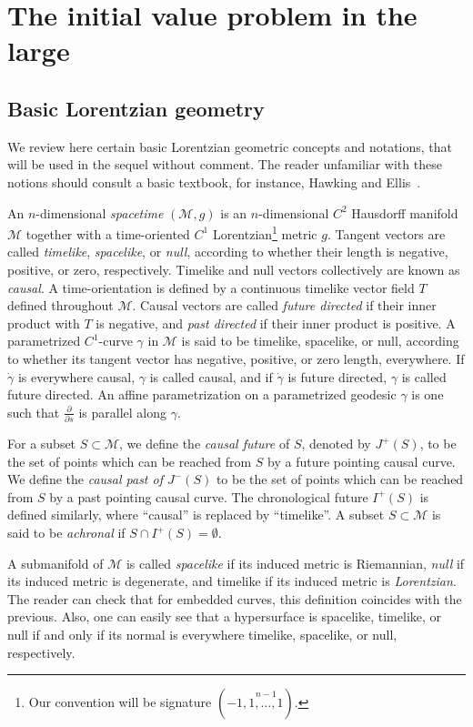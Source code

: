\documentclass{article}
\begin{document}
\section{The initial value problem in the large}
\label{ivpinl}
\subsection{Basic Lorentzian geometry}
\label{lorapp}
We review here certain basic Lorentzian geometric concepts and notations,
that will be used in the sequel without comment.
The reader unfamiliar with these notions should consult a 
basic textbook, for instance, Hawking and Ellis~\cite{he:lssst}.

An $n$-dimensional \emph{spacetime} $(\mathcal{M}, g)$ is an
$n$-dimensional $C^2$ Hausdorff
manifold $\mathcal{M}$ together with a 
time-oriented $C^1$ Lorentzian\footnote{Our convention will be
signature $(-1,\stackrel{n-1}{1,\ldots,1})$.} metric $g$. 
Tangent vectors are called \emph{timelike}, 
\emph{spacelike}, or \emph{null}, according to whether their
length is negative, positive, or zero, respectively. Timelike and null vectors
collectively are known as \emph{causal}. A time-orientation is defined
by a continuous timelike vector field $T$ defined throughout $\mathcal{M}$.
Causal vectors are called \emph{future directed} if their inner product with 
$T$ is negative, and \emph{past directed} if their inner 
product is positive. A parametrized $C^1$-curve $\gamma$ in 
$\mathcal{M}$ is said to be timelike, spacelike, or null, 
according to whether its tangent vector has negative, positive, 
or zero length, everywhere.
If $\dot\gamma$ is everywhere causal, $\gamma$ is called
causal, and if $\dot\gamma$ is future directed, $\gamma$
is called future directed.
An affine parametrization on a parametrized geodesic $\gamma$ is one such
that $\frac{\partial}{\partial s}$ is parallel along $\gamma$. 

 For a subset $S\subset\mathcal{M}$, we define the 
\emph{causal future} of $S$, denoted by $J^+(S)$, to be
the set of points which can be reached from $S$ by a future pointing
causal curve. We define 
the \emph{causal past of $J^-(S)$} 
to be the set of points which can be reached from $S$ by a past
pointing causal curve.
The chronological future $I^+(S)$ is defined similarly, where
``causal'' is replaced by ``timelike''.
A subset $S\subset\mathcal{M}$ 
is said to be \emph{achronal} if $S\cap I^+(S)=\emptyset$.

A submanifold of $\mathcal{M}$ is called \emph{spacelike}
if its induced metric is Riemannian, \emph{null} if its induced metric
is degenerate, and timelike if its induced metric is \emph{Lorentzian}.
The reader can check that for embedded curves, this definition coincides
with the previous. Also, one can easily see that a hypersurface
is spacelike, timelike, or null if and only if its normal is 
everywhere timelike, spacelike, or null, respectively.
\end{document}
